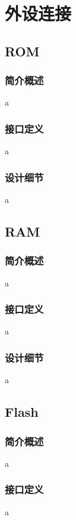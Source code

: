 \chapter{外设连接}

\section{ROM}

    \subsection{简介概述}
    a

    \subsection{接口定义}
    a

    \subsection{设计细节}
    a

\section{RAM}

    \subsection{简介概述}
    a

    \subsection{接口定义}
    a

    \subsection{设计细节}
    a

\section{Flash}

    \subsection{简介概述}
    a

    \subsection{接口定义}
    a

